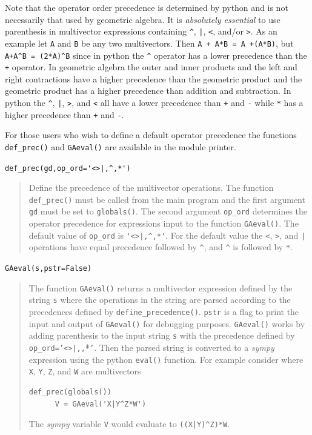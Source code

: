 \documentclass[12pt]{report}
\newcommand{\T}[1]{\texttt{#1}}
\begin{document}
    Note that the operator order precedence is determined by python and is not
    necessarily that used by geometric algebra. It is \emph{absolutely essential} to
    use parenthesis in multivector
    expressions containing \T{\^}, \T{|}, \T{<}, and/or \T{>}.  As an example let
    \T{A} and \T{B} be any two multivectors. Then \T{A + A*B = A +(A*B)}, but
    \lstinline!A+A^B = (2*A)^B! since in python the \T{\^} operator has a lower precedence
    than the \T{+} operator.  In geometric algebra the outer and inner products and
    the left and right contractions have a higher precedence than the geometric
    product and the geometric product has a higher precedence than addition and
    subtraction.  In python the \T{\^}, \T{|}, \T{>}, and \T{<} all have a lower
    precedence than \T{+} and \T{-} while \T{*} has a higher precedence than
    \T{+} and \T{-}.

For those users who wish to define a default operator precedence the functions
\T{def\_prec()} and \T{GAeval()} are available in the module printer.

   \lstinline$def_prec(gd,op_ord='<>|,^,*')$
   \begin{quote}
   Define the precedence of the multivector operations.  The function
   \T{def\_prec()} must be called from the main program and the
   first argument \T{gd} must be set to \T{globals()}.  The second argument
   \T{op\_ord} determines the operator precedence for expressions input to
   the function \T{GAeval()}. The default value of \T{op\_ord} is \lstinline$'<>|,^,*'$.
   For the default value the \T{<}, \T{>}, and \T{|} operations have equal
   precedence followed by \T{\^}, and \T{\^} is followed by \T{*}.
   \end{quote}

   \T{GAeval(s,pstr=False)}
   \begin{quote}
   The function \T{GAeval()} returns a multivector expression defined by the
   string \T{s} where the operations in the string are parsed according to
   the precedences defined by \T{define\_precedence()}. \T{pstr} is a flag
   to print the input and output of \T{GAeval()} for debugging purposes.
   \T{GAeval()} works by adding parenthesis to the input string \T{s} with the
   precedence defined by \T{op\_ord='<>|,\^,*'}.  Then the parsed string is
   converted to a \emph{sympy} expression using the python \T{eval()} function.
   For example consider where \T{X}, \T{Y}, \T{Z}, and \T{W} are multivectors

    \begin{lstlisting}[numbers=none]
      def_prec(globals())
      V = GAeval('X|Y^Z*W')
    \end{lstlisting}

   The \emph{sympy} variable \T{V} would evaluate to \lstinline!((X|Y)^Z)*W!.
   \end{quote}
\end{document}
